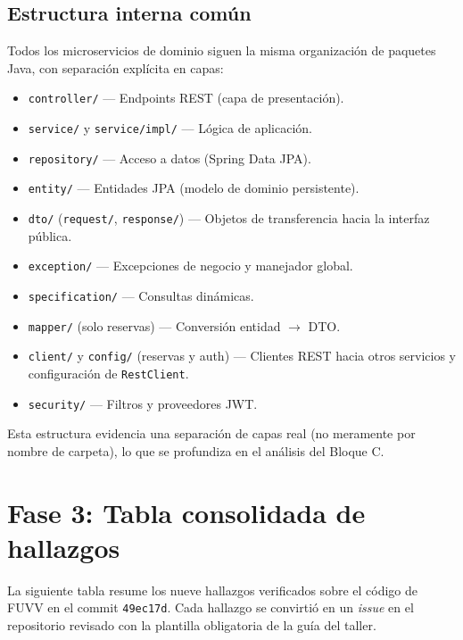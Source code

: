 \documentclass[11pt,a4paper]{article}
\begin{document}
\subsection{Estructura interna común}

Todos los microservicios de dominio siguen la misma organización de paquetes
Java, con separación explícita en capas:

\begin{itemize}
  \item \texttt{controller/} --- Endpoints REST (capa de presentación).
  \item \texttt{service/} y \texttt{service/impl/} --- Lógica de aplicación.
  \item \texttt{repository/} --- Acceso a datos (Spring Data JPA).
  \item \texttt{entity/} --- Entidades JPA (modelo de dominio persistente).
  \item \texttt{dto/} (\texttt{request/}, \texttt{response/}) --- Objetos de
        transferencia hacia la interfaz pública.
  \item \texttt{exception/} --- Excepciones de negocio y manejador global.
  \item \texttt{specification/} --- Consultas dinámicas.
  \item \texttt{mapper/} (solo reservas) --- Conversión entidad $\rightarrow$ DTO.
  \item \texttt{client/} y \texttt{config/} (reservas y auth) --- Clientes REST
        hacia otros servicios y configuración de \texttt{RestClient}.
  \item \texttt{security/} --- Filtros y proveedores JWT.
\end{itemize}

Esta estructura evidencia una separación de capas real (no meramente por
nombre de carpeta), lo que se profundiza en el análisis del Bloque C.

\section{Fase 3: Tabla consolidada de hallazgos}

La siguiente tabla resume los nueve hallazgos verificados sobre el código de
FUVV en el commit \texttt{49ec17d}. Cada hallazgo se convirtió en un
\emph{issue} en el repositorio revisado con la plantilla obligatoria de la
guía del taller.
\end{document}
